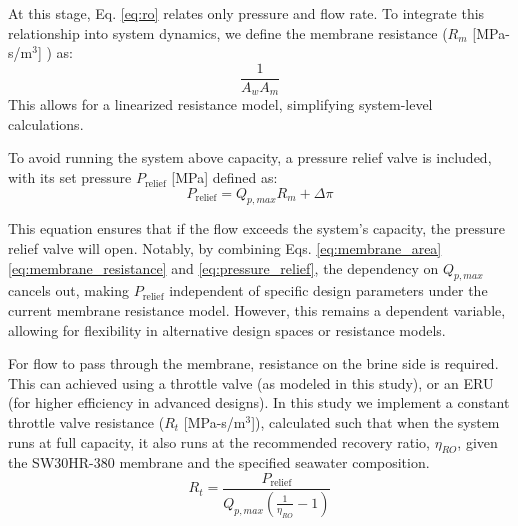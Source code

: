 \documentclass[twocolumn,10pt]{asme2e}
\begin{document}
At this stage, Eq. \ref{eq:ro} relates only pressure and flow rate. To integrate this relationship into system dynamics, we define the membrane resistance ($R_m$ [MPa-s/m$^3$] ) as:
\begin{equation}
    \frac{1}{A_w A_m}
    \label{eq:membrane_resistance}
\end{equation}
\noindent This allows for a linearized resistance model, simplifying system-level calculations.

To avoid running the system above capacity, a pressure relief valve is included, with its set pressure $P_{\text{relief}}$ [MPa] defined as:
\begin{equation}
    P_{\text{relief}} = Q_{p,max}R_m + \Delta \pi
    \label{eq:pressure_relief}
\end{equation}

This equation ensures that if the flow exceeds the system's capacity, the pressure relief valve will open. Notably, by combining Eqs. \ref{eq:membrane_area} \ref{eq:membrane_resistance} and \ref{eq:pressure_relief}, the dependency on $Q_{p,max}$ cancels out, making $P_{\text{relief}}$ independent of specific design parameters under the current membrane resistance model. However, this remains a dependent variable, allowing for flexibility in alternative design spaces or resistance models.

For flow to pass through the membrane, resistance on the brine side is required. This can achieved using a throttle valve (as modeled in this study), or an ERU (for higher efficiency in advanced designs). In this study we implement a constant throttle valve resistance ($R_t$ [MPa-s/m$^3$]), calculated such that when the system runs at full capacity, it also runs at the recommended recovery ratio, $\eta_{RO}$, given the SW30HR-380 membrane and the specified seawater composition.
\begin{equation}
    R_t = \frac{P_{\text{relief}}}{Q_{p,max}(\frac{1}{\eta_{RO}} - 1)}
\end{equation}
\end{document}
